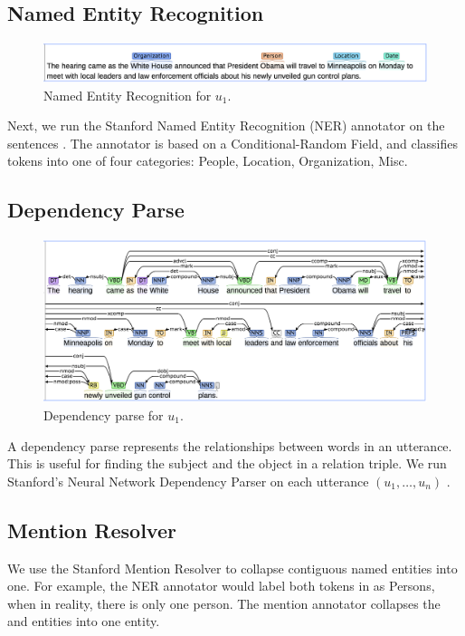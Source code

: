 \subsection{Named Entity Recognition}

\begin{figure}
\includegraphics[scale=0.33]{figures/ner.png}
\caption{
\label{fig:ner}
Named Entity Recognition for $u_1$.
}
\end{figure}

Next, we run the Stanford Named Entity Recognition (NER)
annotator on the sentences \citep{finkel2005incorporating}. The annotator is
based on a Conditional-Random Field, and
classifies tokens into one of four categories: People, Location, Organization, Misc.

\subsection{Dependency Parse}

\begin{figure}
\includegraphics[scale=0.33]{figures/dep.png}
\caption{
\label{fig:dep}
Dependency parse for $u_1$.
}
\end{figure}

A dependency parse represents the relationships between words
in an utterance. This is useful for finding the subject and 
the object in a relation triple. We run Stanford's Neural 
Network Dependency Parser on each utterance $(u_1,\dots,u_n)$
\citep{chen2014nndep}.
\subsection{Mention Resolver}
We use the Stanford Mention Resolver to collapse contiguous
named entities into one. For example, the NER annotator would
label both tokens in  as Persons, when in reality,
there is only one person. The mention annotator collapses the
 and  entities into one entity.

